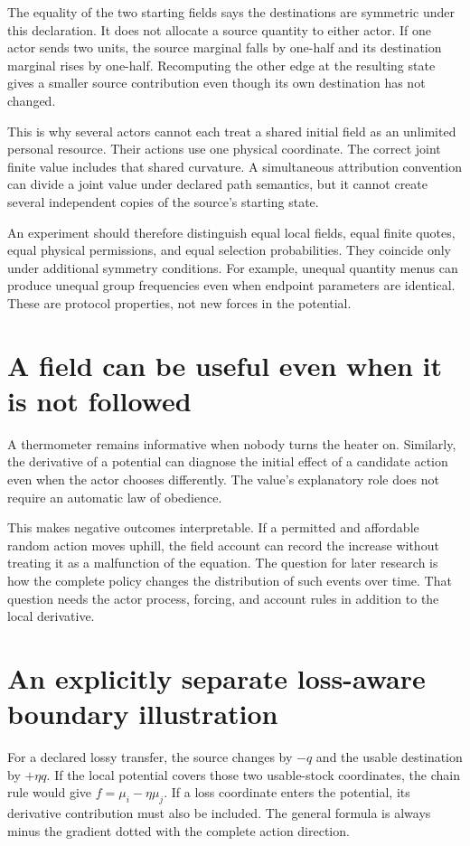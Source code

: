 The equality of the two starting fields says the destinations are symmetric under this declaration. It does not allocate a source quantity to either actor. If one actor sends two units, the source marginal falls by one-half and its destination marginal rises by one-half. Recomputing the other edge at the resulting state gives a smaller source contribution even though its own destination has not changed.

This is why several actors cannot each treat a shared initial field as an unlimited personal resource. Their actions use one physical coordinate. The correct joint finite value includes that shared curvature. A simultaneous attribution convention can divide a joint value under declared path semantics, but it cannot create several independent copies of the source's starting state.

An experiment should therefore distinguish equal local fields, equal finite quotes, equal physical permissions, and equal selection probabilities. They coincide only under additional symmetry conditions. For example, unequal quantity menus can produce unequal group frequencies even when endpoint parameters are identical. These are protocol properties, not new forces in the potential.

\section{A field can be useful even when it is not followed}
A thermometer remains informative when nobody turns the heater on. Similarly, the derivative of a potential can diagnose the initial effect of a candidate action even when the actor chooses differently. The value's explanatory role does not require an automatic law of obedience.

This makes negative outcomes interpretable. If a permitted and affordable random action moves uphill, the field account can record the increase without treating it as a malfunction of the equation. The question for later research is how the complete policy changes the distribution of such events over time. That question needs the actor process, forcing, and account rules in addition to the local derivative.

\section{An explicitly separate loss-aware boundary illustration}
For a declared lossy transfer, the source changes by \(-q\) and the usable destination by \(+\eta q\). If the local potential covers those two usable-stock coordinates, the chain rule would give \(f=\mu_i-\eta\mu_j\). If a loss coordinate enters the potential, its derivative contribution must also be included. The general formula is always minus the gradient dotted with the complete action direction.

